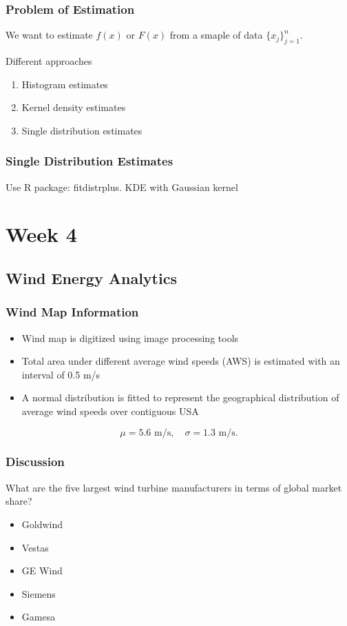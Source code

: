 \documentclass[12pt, a4paper]{report}
\begin{document}
  \section{Problem of Estimation}

  We want to estimate $ f(x) $ or $ F(x) $ from a smaple of data $ \{x_j\}_{j=1}^n. $

  Different approaches

  \begin{enumerate}
    \item Histogram estimates
    \item Kernel density estimates
    \item Single distribution estimates
  \end{enumerate}

  \section{Single Distribution Estimates}

  Use R package: fitdistrplus. KDE with Gaussian kernel

  \part{Week 4}

  \chapter{Wind Energy Analytics}

  \section{Wind Map Information}

  \begin{itemize}
    \item Wind map is digitized using image processing tools
    \item Total area under different average wind speeds (AWS) is estimated with an interval of 0.5 m/s
    \item A normal distribution is fitted to represent the geographical distribution of average wind speeds over contiguous USA
  \end{itemize}

  \[
      \mu = 5.6 \text{ m/s}, \quad \sigma = 1.3 \text{ m/s}
    .\]

  \section{Discussion}

  What are the five largest wind turbine manufacturers in terms of global market share?

  \begin{itemize}
    \item Goldwind
    \item Vestas
    \item GE Wind
    \item Siemens
    \item Gamesa
  \end{itemize}
\end{document}
